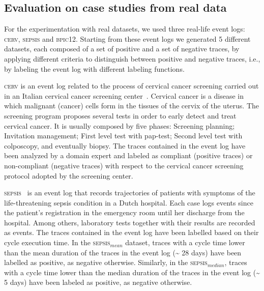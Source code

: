 
\subsection{Evaluation on case studies from real data}
\label{sec:realdata}


For the experimentation with real datasets, we used three real-life event logs: \textsc{cerv}, \textsc{sepsis} and \textsc{bpic12}. Starting from these event logs we generated 5 different datasets, each composed of a set of positive and a set of negative traces, by applying different criteria to distinguish between positive and negative traces, i.e., by labeling the event log with different labeling functions. 

\textsc{cerv} is an event log related to the process of cervical cancer screening carried out in an Italian cervical cancer screening center~\cite{2007b-Lamma}. Cervical cancer is a disease in which malignant (cancer) cells form in the tissues of the cervix of the uterus. The screening program proposes several tests in order to early detect and treat cervical cancer. It is usually composed by five phases: Screening planning; Invitation management; First level test with pap-test; Second level test with colposcopy, and eventually biopsy. The traces contained in the event log have been analyzed by a domain expert and labeled as compliant (positive traces) or non-compliant (negative traces) with respect to the cervical cancer screening protocol adopted by the screening center.

\textsc{sepsis}~\cite{Sepsis} is an event log that records trajectories of patients with symptoms of the life-threatening sepsis condition in a Dutch hospital.
Each case logs events since the patient’s registration in the emergency room until her discharge from the hospital. Among others, laboratory tests together with their results are recorded as events. The traces contained in the event log have been labelled based on their cycle execution time. In the \textsc{sepsis$_{mean}$} dataset, traces with a cycle time lower than the mean duration of the traces in the event log (\textasciitilde\xspace 28 days) have been labelled as positive, as negative otherwise. Similarly, in the \textsc{sepsis$_{median}$}, traces with a cycle time lower than the median duration of the traces in the event log (\textasciitilde\xspace 5 days)  have been labeled as positive, as negative otherwise.  

